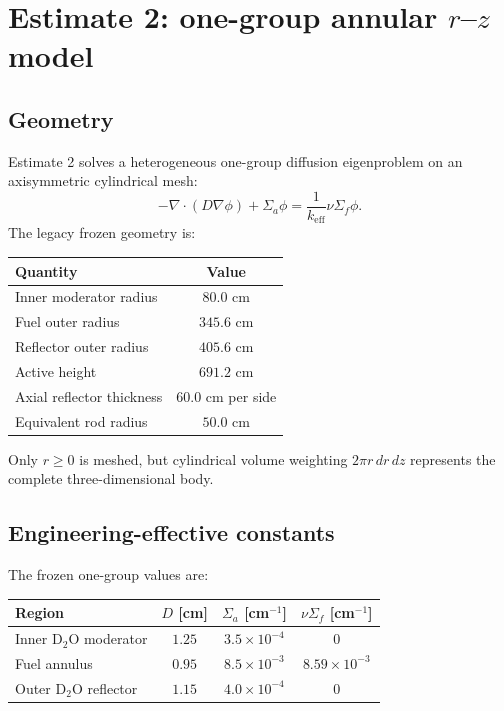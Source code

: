 \documentclass[11pt]{article}
\begin{document}
\section{Estimate 2: one-group annular $r$--$z$ model}

\subsection{Geometry}

Estimate 2 solves a heterogeneous one-group diffusion eigenproblem on an
axisymmetric cylindrical mesh:
\[
-\nabla\cdot(D\nabla\phi)+\Sigma_a\phi
=\frac{1}{k_{\mathrm{eff}}}\nu\Sigma_f\phi.
\]
The legacy frozen geometry is:

\begin{center}
\begin{tabular}{lc}
\toprule
Quantity & Value \\
\midrule
Inner moderator radius & $80.0$ cm \\
Fuel outer radius & $345.6$ cm \\
Reflector outer radius & $405.6$ cm \\
Active height & $691.2$ cm \\
Axial reflector thickness & $60.0$ cm per side \\
Equivalent rod radius & $50.0$ cm \\
\bottomrule
\end{tabular}
\end{center}

Only $r\geq0$ is meshed, but cylindrical volume weighting
$2\pi r\,dr\,dz$ represents the complete three-dimensional body.

\subsection{Engineering-effective constants}

The frozen one-group values are:

\begin{center}
\begin{tabular}{lccc}
\toprule
Region & $D$ [cm] & $\Sigma_a$ [cm$^{-1}$] &
$\nu\Sigma_f$ [cm$^{-1}$] \\
\midrule
Inner D$_2$O moderator & $1.25$ & $3.5\times10^{-4}$ & $0$ \\
Fuel annulus & $0.95$ & $8.5\times10^{-3}$ & $8.59\times10^{-3}$ \\
Outer D$_2$O reflector & $1.15$ & $4.0\times10^{-4}$ & $0$ \\
\bottomrule
\end{tabular}
\end{center}
\end{document}
